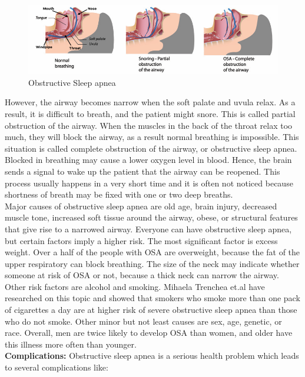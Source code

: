     \begin{figure}
        \centering
        \includegraphics[width=1.0\textwidth]{Figures/ObstructionVentilationApnea.png}
        \caption{Obstructive Sleep apnea \citep{HudsonOSA}}
        \label{fig:Figures/ObstructionVentilationApnea}
    \end{figure}
    However, the airway becomes narrow when the soft palate and uvula relax. As a result, it is difficult to breath, and the patient might snore. This is called partial obstruction of the airway. When the muscles in the back of the throat relax too much, they will block the airway, as a result normal breathing is impossible. This situation is called complete obstruction of the airway, or obstructive sleep apnea. Blocked in breathing may cause a lower oxygen level in blood. Hence, the brain sends a signal to wake up the patient that the airway can be reopened. This process usually happens in a very short time and it is often not noticed because shortness of breath may be fixed with one or two deep breaths.\\ 
    Major causes of obstructive sleep apnea are old age, brain injury, decreased muscle tone, increased soft tissue around the airway, obese, or structural features that give rise to a narrowed airway\citep{OSAWiki}. Everyone can have obstructive sleep apnea, but certain factors imply a higher risk. The most significant factor is excess weight. Over a half of the people with OSA are overweight, because the fat of the upper respiratory can block breathing. The size of the neck may indicate whether someone at risk of OSA or not, because a thick neck can narrow the airway. Other risk factors are alcohol and smoking. Mihaela Trenchea et.al have researched on this topic and showed that smokers who smoke more than one pack  of cigarettes a day are at higher risk of severe obstructive sleep apnea than those who do not smoke\citep{ChestWorldCongress}. Other minor but not least causes are sex, age, genetic, or race. Overall, men are twice likely to develop OSA than women, and older have this illness more often than younger.\\
    \textbf{Complications:} Obstructive sleep apnea is a serious health problem which leads to several complications like:\\
